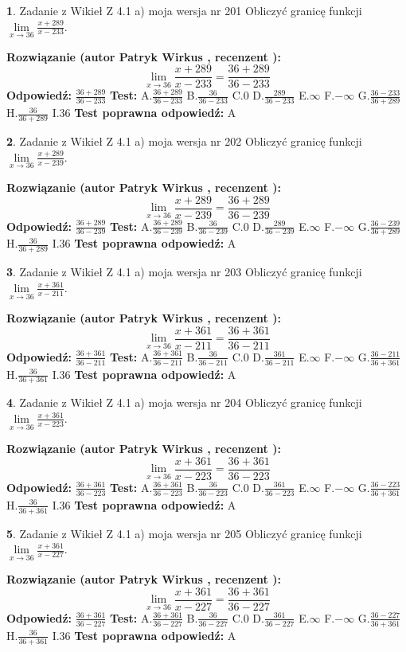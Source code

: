 \documentclass[12pt, a4paper]{article}
\theoremstyle{definition} %
\newtheorem{zad}{}
\newcommand{\zadStart}[1]{\begin{zad}#1\newline}
\newcommand{\zadStop}{\end{zad}}
\newcommand{\rozwStart}[2]{\noindent \textbf{Rozwiązanie (autor #1 , recenzent #2): }\newline}
\newcommand{\rozwStop}{\newline}
\newcommand{\odpStart}{\noindent \textbf{Odpowiedź:}\newline}
\newcommand{\odpStop}{\newline}
\newcommand{\testStart}{\noindent \textbf{Test:}\newline}
\newcommand{\testStop}{\newline}
\newcommand{\kluczStart}{\noindent \textbf{Test poprawna odpowiedź:}\newline}
\newcommand{\kluczStop}{\newline}
\begin{document}
\zadStart{Zadanie z Wikieł Z 4.1 a) moja wersja nr 201}
Obliczyć granicę funkcji $\lim\limits_{x\to36}\frac{x+289}{x-233}$.
\zadStop
\rozwStart{Patryk Wirkus}{}
$$\lim\limits_{x\to36}\frac{x+289}{x-233} = \frac{36+289}{36-233}$$
\rozwStop
\odpStart
$\frac{36+289}{36-233}$
\odpStop
\testStart
A.$\frac{36+289}{36-233}$
B.$\frac{36}{36-233}$
C.$0$
D.$\frac{289}{36-233}$
E.$\infty$
F.$-\infty$
G.$\frac{36-233}{36+289}$
H.$\frac{36}{36+289}$
I.$36$
\testStop
\kluczStart
A
\kluczStop



\zadStart{Zadanie z Wikieł Z 4.1 a) moja wersja nr 202}
Obliczyć granicę funkcji $\lim\limits_{x\to36}\frac{x+289}{x-239}$.
\zadStop
\rozwStart{Patryk Wirkus}{}
$$\lim\limits_{x\to36}\frac{x+289}{x-239} = \frac{36+289}{36-239}$$
\rozwStop
\odpStart
$\frac{36+289}{36-239}$
\odpStop
\testStart
A.$\frac{36+289}{36-239}$
B.$\frac{36}{36-239}$
C.$0$
D.$\frac{289}{36-239}$
E.$\infty$
F.$-\infty$
G.$\frac{36-239}{36+289}$
H.$\frac{36}{36+289}$
I.$36$
\testStop
\kluczStart
A
\kluczStop



\zadStart{Zadanie z Wikieł Z 4.1 a) moja wersja nr 203}
Obliczyć granicę funkcji $\lim\limits_{x\to36}\frac{x+361}{x-211}$.
\zadStop
\rozwStart{Patryk Wirkus}{}
$$\lim\limits_{x\to36}\frac{x+361}{x-211} = \frac{36+361}{36-211}$$
\rozwStop
\odpStart
$\frac{36+361}{36-211}$
\odpStop
\testStart
A.$\frac{36+361}{36-211}$
B.$\frac{36}{36-211}$
C.$0$
D.$\frac{361}{36-211}$
E.$\infty$
F.$-\infty$
G.$\frac{36-211}{36+361}$
H.$\frac{36}{36+361}$
I.$36$
\testStop
\kluczStart
A
\kluczStop



\zadStart{Zadanie z Wikieł Z 4.1 a) moja wersja nr 204}
Obliczyć granicę funkcji $\lim\limits_{x\to36}\frac{x+361}{x-223}$.
\zadStop
\rozwStart{Patryk Wirkus}{}
$$\lim\limits_{x\to36}\frac{x+361}{x-223} = \frac{36+361}{36-223}$$
\rozwStop
\odpStart
$\frac{36+361}{36-223}$
\odpStop
\testStart
A.$\frac{36+361}{36-223}$
B.$\frac{36}{36-223}$
C.$0$
D.$\frac{361}{36-223}$
E.$\infty$
F.$-\infty$
G.$\frac{36-223}{36+361}$
H.$\frac{36}{36+361}$
I.$36$
\testStop
\kluczStart
A
\kluczStop



\zadStart{Zadanie z Wikieł Z 4.1 a) moja wersja nr 205}
Obliczyć granicę funkcji $\lim\limits_{x\to36}\frac{x+361}{x-227}$.
\zadStop
\rozwStart{Patryk Wirkus}{}
$$\lim\limits_{x\to36}\frac{x+361}{x-227} = \frac{36+361}{36-227}$$
\rozwStop
\odpStart
$\frac{36+361}{36-227}$
\odpStop
\testStart
A.$\frac{36+361}{36-227}$
B.$\frac{36}{36-227}$
C.$0$
D.$\frac{361}{36-227}$
E.$\infty$
F.$-\infty$
G.$\frac{36-227}{36+361}$
H.$\frac{36}{36+361}$
I.$36$
\testStop
\kluczStart
A
\kluczStop
\end{document}
